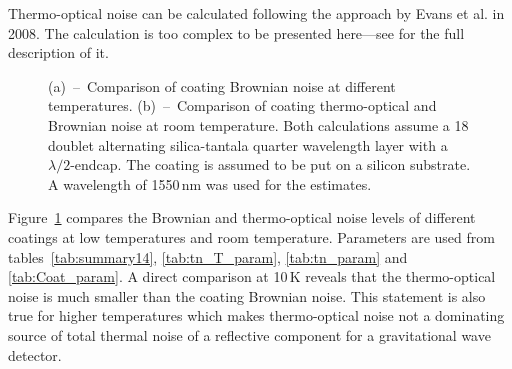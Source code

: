 Thermo-optical noise can be calculated following the approach by Evans et al. in 2008. The calculation is too complex to be presented here---see \cite{Evans2008} for the full description of it. 

\begin{figure}[!h]
\begin{center}
\end{center}
\caption{(a)~--~Comparison of coating Brownian noise at different temperatures. (b)~--~Comparison of coating thermo-optical and Brownian noise at room temperature. Both calculations assume a 18 doublet alternating silica-tantala quarter wavelength layer with a $\lambda/2$-endcap. The coating is assumed to be put on a silicon substrate. A wavelength of 1550\,nm was used for the estimates.}
\label{fig:coat_TN}
\end{figure}


Figure~\ref{fig:coat_TN} compares the Brownian and thermo-optical noise levels of different coatings at low temperatures and room temperature. Parameters are used from tables~\ref{tab:summary14}, \ref{tab:tn_T_param}, \ref{tab:tn_param} and \ref{tab:Coat_param}. A direct comparison at 10\,K reveals that the thermo-optical noise is much smaller than the coating Brownian noise. This statement is also true for higher temperatures which makes thermo-optical noise not a dominating source of total thermal noise of a reflective component for a gravitational wave detector.

